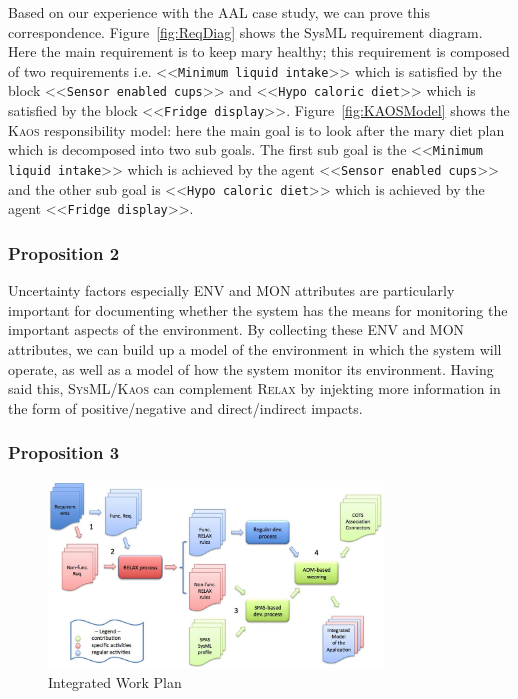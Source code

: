 \documentclass[10pt, conference, compsocconf]{IEEEtran}
\def\myrelax{\textsc{Relax}}                  %
\def\sysml{\textsc{SysML}}
\def\kaos{\textsc{Kaos}}
\newcommand{\Myfig}[1]{Figure~\ref{fig:#1}}
\newcommand{\stereotype}[1]{\textless\textless\texttt{#1}\textgreater\textgreater}
\begin{document}
Based on our experience with the AAL case study, we can prove this correspondence. \Myfig{ReqDiag} shows the SysML requirement diagram. Here the main requirement is to keep mary healthy; this requirement is composed of two requirements i.e. \stereotype{Minimum liquid intake} which is satisfied by the block \stereotype{Sensor enabled cups} and \stereotype{Hypo caloric diet} which is satisfied by the block \stereotype{Fridge display}. \Myfig{KAOSModel} shows the \kaos{} responsibility model: here the main goal is to look after the mary diet plan which is decomposed into two sub goals. The first sub goal is the \stereotype{Minimum liquid intake} which is achieved by the agent \stereotype{Sensor enabled cups} and the other sub goal is \stereotype{Hypo caloric diet} which is achieved by the agent \stereotype{Fridge display}.  

\subsubsection{Proposition 2}

Uncertainty factors especially ENV and MON attributes are particularly important for documenting whether the system has the means for monitoring the important aspects of the environment. By collecting these ENV and MON attributes, we can build up a model of the environment in which the system will operate, as well as a model of how the system monitor its environment. Having said this, \sysml{}/\kaos{} can complement \myrelax{} by injekting more information in the form of positive/negative and direct/indirect impacts. 

\subsubsection{Proposition 3}



\begin{figure}[!t]
\centering
\includegraphics[width=3.5in]{fig1}
\caption{Integrated Work Plan}
\label{fig:Workplan}
\end{figure}
\end{document}
